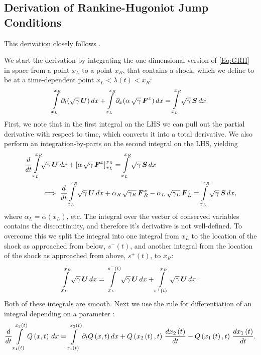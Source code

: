 \documentclass[10pt,preprint]{../aastex}
\begin{document}
\subsection{Derivation of Rankine-Hugoniot Jump Conditions}
This derivation closely follows \citet{RezzollaRelHyd}.

We start the derivation by integrating the one-dimensional version of \eqref{Eq:GRH} in space from a point $x_{L}$ to a point $x_{R}$, that contains a shock, which we define to be at a time-dependent point $x_{L}<\lambda\left(t\right)<x_{R}$:
\begin{equation}
\int\limits_{x_{L}}^{x_{R}}\pd{\left(\sqrt{\gamma}\,\bU\right)}{t}\,dx+\int\limits_{x_{L}}^{x_{R}}\pd{\left(\alpha\,\sqrt{\gamma}\,\bF^{x}\right)}{x}\,dx=\int\limits_{x_{L}}^{x_{R}}\sqrt{\gamma}\,\bS\,dx.
\end{equation}
First, we note that in the first integral on the LHS we can pull out the partial derivative with respect to time, which converts it into a total derivative. We also perform an integration-by-parts on the second integral on the LHS, yielding
\begin{align}
\frac{d}{dt}\int\limits_{x_{L}}^{x_{R}}&\sqrt{\gamma}\,\bU\,dx+\left[\alpha\,\sqrt{\gamma}\,\bF^{x}\right]^{x_{R}}_{x_{L}}=\int\limits_{x_{L}}^{x_{R}}\sqrt{\gamma}\,\bS\,dx\\
&\implies\frac{d}{dt}\int\limits_{x_{L}}^{x_{R}}\sqrt{\gamma}\,\bU\,dx+\alpha_{R}\,\sqrt{\gamma_{R}}\,\bF_{R}^{x}-\alpha_{L}\,\sqrt{\gamma_{L}}\,\bF_{L}^{x}=\int\limits_{x_{L}}^{x_{R}}\sqrt{\gamma}\,\bS\,dx,
\end{align}
where $\alpha_{L}=\alpha\left(x_{L}\right)$, etc. The integral over the vector of conserved variables contains the discontinuity, and therefore it's derivative is not well-defined. To overcome this we split the integral into one integral from $x_{L}$ to the location of the shock as approached from below, $s^{-}\left(t\right)$, and another integral from the location of the shock as approached from above, $s^{+}\left(t\right)$, to $x_{R}$:
\begin{equation}
\int\limits_{x_{L}}^{x_{R}}\sqrt{\gamma}\,\bU\,dx=\int\limits_{x_{L}}^{s^{-}\left(t\right)}\sqrt{\gamma}\,\bU\,dx+\int\limits_{s^{+}\left(t\right)}^{x_{R}}\sqrt{\gamma}\,\bU\,dx.
\end{equation}
Both of these integrals are smooth. Next we use the rule for differentiation of an integral depending on a parameter \citep{RezzollaRelHyd}:
\begin{equation}
\f{d}{dt}\int\limits_{x_{1}\left(t\right)}^{x_{2}\left(t\right)}Q\left(x,t\right)\,dx=\int\limits_{x_{1}\left(t\right)}^{x_{2}\left(t\right)}\pd{Q\left(x,t\right)}{t}\,dx+Q\left(x_{2}\left(t\right),t\right)\,\frac{dx_{2}\left(t\right)}{dt}-Q\left(x_{1}\left(t\right),t\right)\,\frac{dx_{1}\left(t\right)}{dt}.
\end{equation}
\end{document}
